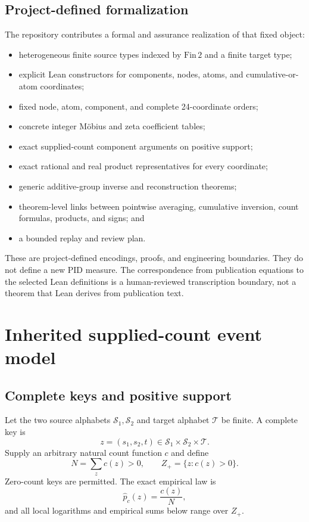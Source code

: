 \documentclass[11pt]{article}
\theoremstyle{definition}
\begin{document}
\subsection{Project-defined formalization}

The repository contributes a formal and assurance realization of that fixed object:
\begin{itemize}[leftmargin=*]
  \item heterogeneous finite source types indexed by \(\mathrm{Fin}\,2\) and a finite target type;
  \item explicit Lean constructors for components, nodes, atoms, and cumulative-or-atom
        coordinates;
  \item fixed node, atom, component, and complete 24-coordinate orders;
  \item concrete integer M\"obius and zeta coefficient tables;
  \item exact supplied-count component arguments on positive support;
  \item exact rational and real product representatives for every coordinate;
  \item generic additive-group inverse and reconstruction theorems;
  \item theorem-level links between pointwise averaging, cumulative inversion, count formulas,
        products, and signs; and
  \item a bounded replay and review plan.
\end{itemize}

These are project-defined encodings, proofs, and engineering boundaries.  They do not define a new
PID measure.  The correspondence from publication equations to the selected Lean definitions is a
human-reviewed transcription boundary, not a theorem that Lean derives from publication text.

\section{Inherited supplied-count event model}

\subsection{Complete keys and positive support}

Let the two source alphabets \(\mathcal S_1,\mathcal S_2\) and target alphabet
\(\mathcal T\) be finite.  A complete key is
\[
z=(s_1,s_2,t)\in\mathcal S_1\times\mathcal S_2\times\mathcal T.
\]
Supply an arbitrary natural count function \(c\) and define
\begin{equation}\label{eq:total}
N=\sum_z c(z)>0,
\qquad
Z_+=\{z:c(z)>0\}.
\end{equation}
Zero-count keys are permitted.  The exact empirical law is
\begin{equation}\label{eq:empirical-law}
\widehat p_c(z)=\frac{c(z)}{N},
\end{equation}
and all local logarithms and empirical sums below range over \(Z_+\).
\end{document}
